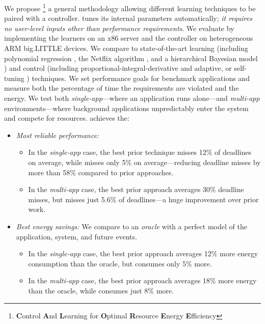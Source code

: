 We propose \SYSTEM{}\footnote{\textbf{C}ontrol \textbf{A}nd
  \textbf{L}earning for \textbf{O}ptimal \textbf{R}esource
  \textbf{E}nergy \textbf{E}fficiency} a general methodology allowing
different learning techniques to be paired with a controller.
\SYSTEM{} tunes its internal parameters automatically; \ie{} \emph{it
  requires no user-level inputs other than performance requirements}.
We evaluate \SYSTEM{} by implementing the learners on an x86 server
and the controller on heterogeneous ARM big.LITTLE devices.  We
compare to state-of-the-art learning (including polynomial regression
\cite{Koala,dubach2010}, the Netflix algorithm \cite{netflix,Paragon},
and a hierarchical Bayesian model \cite{LEO}) and control (including
proportional-integral-derivative \cite{Hellerstein2004a} and adaptive,
or self-tuning \cite{HandbookControl}) techniques.  We set performance
goals for benchmark applications and measure both the percentage of
time the requirements are violated and the energy.  We test both
\emph{single-app}---where an application runs alone---and
\emph{multi-app} environments---where background applications
unpredictably enter the system and compete for resources.  \SYSTEM{}
achieves the:
\begin{itemize}[leftmargin=1em]
\item \textit{Most reliable performance:}
  \begin{itemize}[leftmargin=1em]
  \item In the \emph{single-app} case, the best prior technique misses
    12\% of deadlines on average, while \SYSTEM{} misses only 5\% on
    average---reducing deadline misses by more than 58\% compared to
    prior approaches.
  \item In the \emph{multi-app} case, the best prior approach averages
    30\% deadline misses, but \SYSTEM{} misses just 5.6\% of
    deadlines---a huge improvement over prior work.
  \end{itemize}
\item \textit{Best energy savings:} We compare to an \emph{oracle}
  with a perfect model of the application, system, and future events.
  \begin{itemize}[leftmargin=1em]
  \item In the \emph{single-app} case, the best prior approach
    averages 12\% more energy consumption than the oracle, but
    \SYSTEM{} consumes only 5\% more.
  \item In the \emph{multi-app} case, the best prior approach averages
    18\% more energy than the oracle, while \SYSTEM{} consumes just
    8\% more.
  \end{itemize}
\end{itemize}

